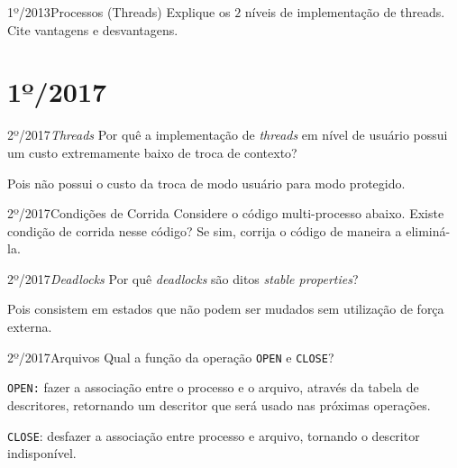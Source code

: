 \begin{exercicio}
  {1º/2013}{Processos (Threads)}
  {Explique os $2$ níveis de implementação de threads. Cite vantagens e desvantagens.}
\end{exercicio}





\section{1º/2017}
\begin{exercicio}
  {2º/2017}{\textit{Threads}}
  {Por quê a implementação de \textit{threads} em nível de usuário possui um custo extremamente baixo de troca de contexto?}

  Pois não possui o custo da troca de modo usuário para modo protegido.
\end{exercicio}

\begin{exercicio}
  {2º/2017}{Condições de Corrida}
  {Considere o código multi-processo abaixo. Existe condição de corrida nesse código? Se sim, corrija o código de maneira a eliminá-la.}
\end{exercicio}

\begin{exercicio}
  {2º/2017}{\textit{Deadlocks}}
  {Por quê \textit{deadlocks} são ditos \textit{stable properties}?}

  Pois consistem em estados que não podem ser mudados sem utilização de força externa.
\end{exercicio}

\begin{exercicio}
  {2º/2017}{Arquivos}
  {Qual a função da operação \texttt{OPEN} e \texttt{CLOSE}?}

  \texttt{OPEN:} fazer a associação entre o processo e o arquivo, através da tabela de descritores, retornando um descritor que será usado nas próximas operações.

  \texttt{CLOSE}: desfazer a associação entre processo e arquivo, tornando o descritor indisponível.
\end{exercicio}


